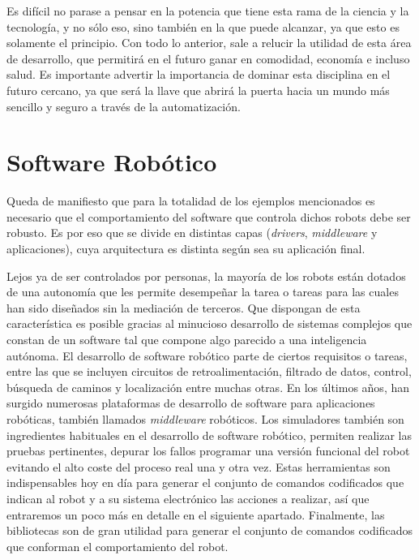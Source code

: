 Es difícil no parase a pensar en la potencia que tiene esta rama de la ciencia y la tecnología, y no sólo eso, sino también en la que puede alcanzar, ya que esto es solamente el principio. Con todo lo anterior, sale a relucir la utilidad de esta área de desarrollo, que permitirá en el futuro ganar en comodidad, economía e incluso salud. Es importante advertir la importancia de dominar esta disciplina en el futuro cercano, ya que será la llave que abrirá la puerta hacia un mundo más sencillo y seguro a través de la automatización.

\section{Software Robótico} 
Queda de manifiesto que para la totalidad de los ejemplos mencionados es necesario que el comportamiento del software que controla dichos robots debe ser robusto. Es por eso que se divide en distintas capas (\textit{drivers}, \textit{middleware} y aplicaciones), cuya arquitectura es distinta según sea su aplicación final.

Lejos ya de ser controlados por personas, la mayoría de los robots están dotados de una autonomía que les permite desempeñar la tarea o tareas para las cuales han sido diseñados sin la mediación de terceros. Que dispongan de esta característica es posible gracias al minucioso desarrollo de sistemas complejos que constan de un software tal que compone algo parecido a una inteligencia autónoma.
El desarrollo de software robótico parte de ciertos requisitos o tareas, entre las que se incluyen circuitos de retroalimentación, filtrado de datos, control, búsqueda de caminos y localización entre muchas otras. En los últimos años, han surgido numerosas plataformas de desarrollo de software para aplicaciones robóticas, también llamados \textit{middleware} robóticos. Los simuladores también son ingredientes habituales en el desarrollo de software robótico, permiten realizar las pruebas pertinentes, depurar los fallos programar una versión funcional del robot evitando el alto coste del proceso real una y otra vez. Estas herramientas son indispensables hoy en día para generar el conjunto de comandos codificados que indican al robot y a su sistema electrónico las acciones a realizar, así que entraremos un poco más en detalle en el siguiente apartado. Finalmente, las bibliotecas son de gran utilidad para generar el conjunto de comandos codificados que conforman el comportamiento del robot.

